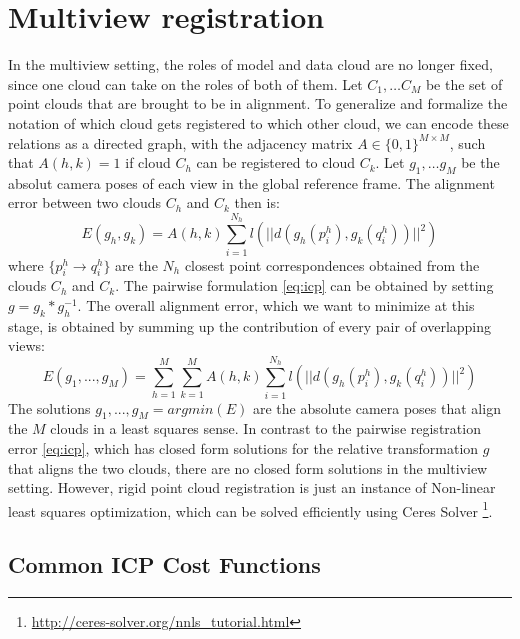 \documentclass[12pt, a4paper]{article}
\begin{document}
\section{Multiview registration}
In the multiview setting, the roles of model and data cloud are no longer fixed, since one cloud can take on the roles of both of them. Let $C_1, \dots C_M$ be the set of point clouds that are brought to be in alignment.
To generalize and formalize the notation of which cloud gets registered to which other cloud, we can encode these relations as a directed graph, with the adjacency matrix $A \in \{0,1\}^{M \times M}$, such that $A(h,k) = 1$ if cloud $C_h$ can be registered to cloud $C_k$. Let $g_1, \dots g_M$ be the absolut camera poses of each view in the global reference frame. The alignment error between two clouds $C_h$ and $C_k$ then is:
\begin{equation}
	E(g_h, g_k) = A(h,k) \sum_{i=1}^{N_h} l(||d(g_h(p_i^h),g_k(q_i^h))||^2) \label{eq:mvlmicp-pair}
\end{equation}
where $\{p_i^h \rightarrow q_i^h\}$ are the $N_h$ closest point correspondences obtained from the clouds $C_h$ and $C_k$.
The pairwise formulation \eqref{eq:icp} can be obtained by setting $g=g_k * g_h^{-1}$. The overall alignment error, which we want to minimize at this stage, is obtained by summing up the contribution of every pair of overlapping views:
\begin{equation}
E(g_1, ..., g_M) = \sum_{h=1}^M \sum_{k=1}^M A(h,k) \sum_{i=1}^{N_h} l(||d(g_h(p_i^h),g_k(q_i^h))||^2) \label{eq:mvlmicp-general}
\end{equation}
The solutions $g_1, ..., g_M = argmin(E)$ are the absolute camera poses that align the $M$ clouds in a least squares sense. In contrast to the pairwise registration error \eqref{eq:icp}, which has closed form solutions for the relative transformation $g$ that aligns the two clouds, there are no closed form solutions in the multiview setting. However, rigid point cloud registration is just an instance of Non-linear least squares optimization, which can be solved efficiently using Ceres Solver \footnote{\url{http://ceres-solver.org/nnls_tutorial.html}}.

\subsection{Common ICP Cost Functions}
\end{document}
